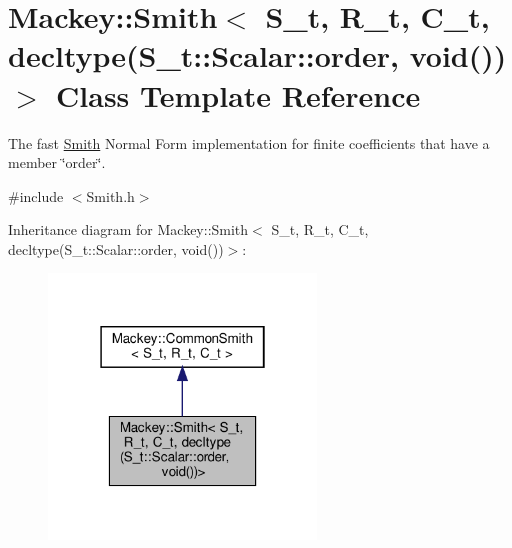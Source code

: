 \hypertarget{classMackey_1_1Smith_3_01S__t_00_01R__t_00_01C__t_00_01decltype_07S__t_1_1Scalar_1_1order_00_01void_07_08_08_4}{}\section{Mackey\+:\+:Smith$<$ S\+\_\+t, R\+\_\+t, C\+\_\+t, decltype(S\+\_\+t\+:\+:Scalar\+:\+:order, void())$>$ Class Template Reference}
\label{classMackey_1_1Smith_3_01S__t_00_01R__t_00_01C__t_00_01decltype_07S__t_1_1Scalar_1_1order_00_01void_07_08_08_4}


The fast \hyperlink{classMackey_1_1Smith}{Smith} Normal Form implementation for finite coefficients that have a member \char`\"{}order\char`\"{}.  




{\ttfamily \#include $<$Smith.\+h$>$}



Inheritance diagram for Mackey\+:\+:Smith$<$ S\+\_\+t, R\+\_\+t, C\+\_\+t, decltype(S\+\_\+t\+:\+:Scalar\+:\+:order, void())$>$\+:\nopagebreak
\begin{figure}[H]
\begin{center}
\leavevmode
\includegraphics[width=202pt]{classMackey_1_1Smith_3_01S__t_00_01R__t_00_01C__t_00_01decltype_07S__t_1_1Scalar_1_1order_00_01void_07_08_08_4__inherit__graph}
\end{center}
\end{figure}



